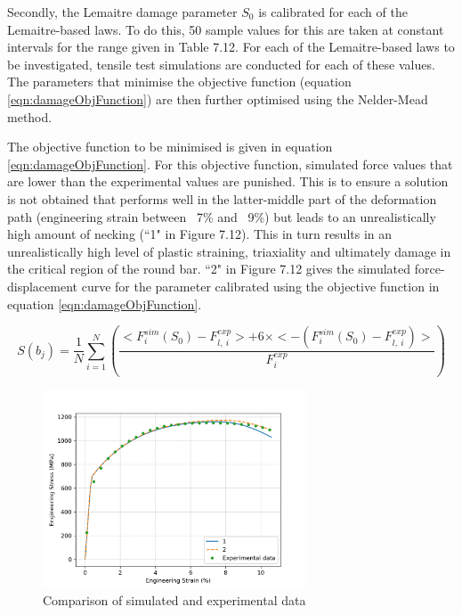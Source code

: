 \documentclass[sn-mathphys,Numbered,draft]{sn-jnl}%
\begin{document}
Secondly, the Lemaitre damage parameter $S_0$ is calibrated for each of the Lemaitre-based laws. To do this, 50 sample values for this are taken at constant intervals for the range given in Table 7.12. For each of the Lemaitre-based laws to be investigated, tensile test simulations are conducted for each of these values. The parameters that minimise the objective function (equation \ref{eqn:damageObjFunction}) are then further optimised using the Nelder-Mead method.

The objective function to be minimised is given in equation \ref{eqn:damageObjFunction}. For this objective function, simulated force values that are lower than the experimental values are punished. This is to ensure a solution is not obtained that performs well in the latter-middle part of the deformation path (engineering strain between ~7\% and ~9\%) but leads to an unrealistically high amount of necking (``1" in Figure 7.12). This in turn results in an unrealistically high level of plastic straining, triaxiality and ultimately damage in the critical region of the round bar. ``2" in Figure 7.12 gives the simulated force-displacement curve for the parameter calibrated using the objective function in equation \ref{eqn:damageObjFunction}.

\begin{equation}
\label{eqn:damageObjFunction}
S(b_j)=\frac{1}{N} \sum_{i=1}^N\left(\frac{<F^{sim}_i(S_0)-F^{exp}_{l,\ i}>+6\times<-\left(F^{sim}_i(S_0)-F^{exp}_{l,\ i}\right)>}{F^{exp}_i}\right)
\end{equation}

\begin{figure}[htb]
\begin{center}
	\includegraphics[width=0.7\textwidth]{./Figures/SimulationAndAnalysis/compareExperimentalSimulation/compareNecking.png}
\caption{Comparison of simulated and experimental data}
\label{fig:notchedRoundBAr}
\end{center}
\end{figure}
\end{document}

